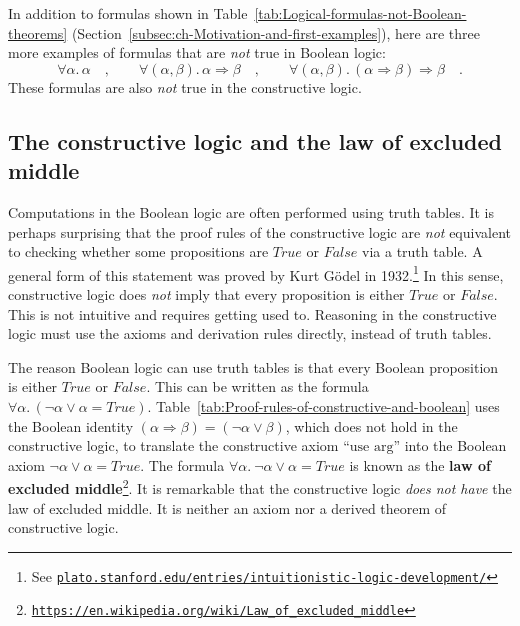 In addition to formulas shown in Table~\ref{tab:Logical-formulas-not-Boolean-theorems}
(Section~\ref{subsec:ch-Motivation-and-first-examples}), here are
three more examples of formulas that are \emph{not} true in Boolean
logic:
\[
\forall\alpha.\,\alpha\quad,\quad\quad\forall(\alpha,\beta).\,\alpha\Rightarrow\beta\quad,\quad\quad\forall(\alpha,\beta).\,(\alpha\Rightarrow\beta)\Rightarrow\beta\quad.
\]
These formulas are also \emph{not} true in the constructive logic.

\subsection{The constructive logic and the law of excluded middle}

Computations in the Boolean logic are often performed using truth
tables. It is perhaps surprising that the proof rules of the constructive
logic are \emph{not} equivalent to checking whether some propositions
are $True$ or $False$ via a truth table. A general form of this
statement was proved by Kurt G\"odel in
1932.\footnote{See \texttt{\href{https://plato.stanford.edu/entries/intuitionistic-logic-development/\#SomeEarlResu}{plato.stanford.edu/entries/intuitionistic-logic-development/}}}
In this sense, constructive logic does \emph{not} imply that every
proposition is either $True$ or $False$. This is not intuitive and
requires getting used to. Reasoning in the constructive logic must
use the axioms and derivation rules directly, instead of truth tables.

The reason Boolean logic can use truth tables is that every Boolean
proposition is either $True$ or $False$. This can be written as
the formula $\forall\alpha.\,(\neg\alpha\vee\alpha=True)$. Table~\ref{tab:Proof-rules-of-constructive-and-boolean}
uses the Boolean identity $\left(\alpha\Rightarrow\beta\right)=(\neg\alpha\vee\beta)$,
which does not hold in the constructive logic, to translate the constructive
axiom \textsf{``}$\text{use arg}$\textsf{''} into the Boolean axiom $\neg\alpha\vee\alpha=True$.
The formula $\forall\alpha.\:\neg\alpha\vee\alpha=True$ is known
as the \textbf{law of excluded middle}\footnote{\texttt{\href{https://en.wikipedia.org/wiki/Law_of_excluded_middle}{https://en.wikipedia.org/wiki/Law\_of\_excluded\_middle}}}.
It is remarkable that the constructive logic \emph{does not have}
the law of excluded middle. It is neither an axiom nor a derived theorem
of constructive logic.

